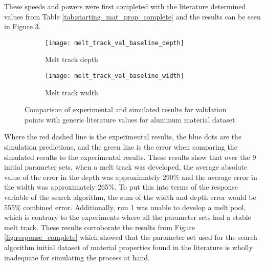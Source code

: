 These speeds and powers were first completed with the literature determined values from Table \ref{tab:starting_mat_prop_complete} and the results can be seen in Figure \ref{fig:melt_track_val_baseline}.
\begin{figure}[!htb]\centering
	\begin{subfigure}[c]{0.45\textwidth}\centering
	\texttt{[image: melt\_track\_val\_baseline\_depth]}
	\caption{Melt track depth}
	\label{fig:melt_track_val_baseline_depth}
	\end{subfigure}\hfill{}
		\begin{subfigure}[c]{0.45\textwidth}\centering
		\texttt{[image: melt\_track\_val\_baseline\_width]}
		\caption{Melt track width}
		\label{fig:melt_track_val_baseline_width}
		\end{subfigure}
	\caption{Comparison of experimental and simulated results for validation points with generic literature values for aluminum material dataset}
	\label{fig:melt_track_val_baseline}
\end{figure}
Where the red dashed line is the experimental results, the blue dots are the simulation predictions, and the green line is the error when comparing the simulated results to the experimental results.
These results show that over the 9 initial parameter sets, when a melt track was developed, the average absolute value of the error in the depth was approximately 290\% and the average error in the width was approximately 265\%.  To put this into terms of the response variable of the search algorithm, the sum of the width and depth error would be 555\% combined error.
Additionally, run 1 was unable to develop a melt pool, which is contrary to the experiments where all the parameter sets had a stable melt track.  These results corroborate the results from Figure \ref{fig:response_complete} which showed that the parameter set used for the search algorithm initial dataset of material properties found in the literature is wholly inadequate for simulating the process at hand. 

